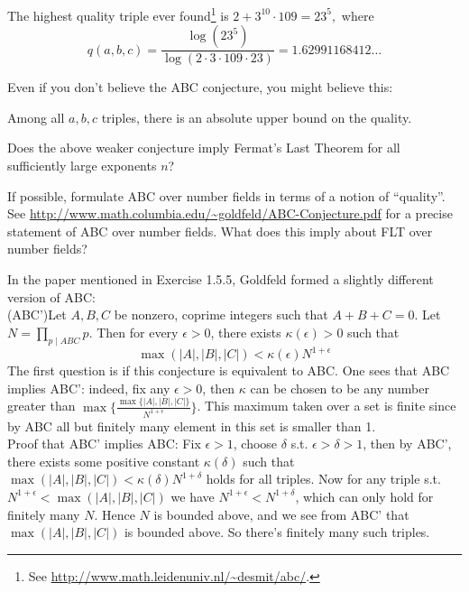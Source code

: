 \documentclass{book}
\begin{document}
The highest quality triple ever found\footnote{See \url{http://www.math.leidenuniv.nl/~desmit/abc/}.} is
$
   2 + 3^{10}\cdot 109 = 23^5,
$
where
$$
q(a,b,c) = \frac{\log(23^5)}{\log(2\cdot 3 \cdot 109 \cdot 23)}
    = 1.62991168412\ldots
$$

Even if you don't believe the ABC conjecture, you might believe this:
\begin{conjecture}
Among all $a,b,c$ triples, there is an absolute upper
bound on the quality.
\end{conjecture}

\begin{exercise}
Does the above weaker conjecture imply Fermat's Last Theorem for all sufficiently large exponents $n$?
\end{exercise}

\begin{exercise}
If possible, formulate ABC over number fields in terms of a notion of ``quality''.  See \url{http://www.math.columbia.edu/~goldfeld/ABC-Conjecture.pdf} for a precise statement of ABC over number fields.
What does this imply about FLT over number fields?
\end{exercise}

In the paper mentioned in Exercise 1.5.5, Goldfeld
formed a slightly different version of ABC: \\

(ABC')Let $A,B,C$ be nonzero, coprime integers such that
$A+B+C = 0$. Let $N = \prod_{p \mid ABC} p$.
Then for every $\epsilon >0$, there exists $\kappa(\epsilon)>0$
such that
\[ \max(|A|,|B|,|C|) < \kappa(\epsilon) N^{1+\epsilon} \]
The first question is if this conjecture is equivalent
to ABC. One sees that ABC implies ABC': indeed, fix
any $\epsilon >0$, then $\kappa$ can be chosen to be any number greater than $\max\{ \frac{\max\{|A|,|B|,|C|\}}{N^{1+\epsilon}}\}$. This maximum taken over a set is finite since by ABC all but finitely many element in
this set is smaller than 1. \\

Proof that ABC' implies ABC: Fix $\epsilon > 1$,
choose $\delta$ s.t. $\epsilon > \delta > 1$, then
by ABC', there exists some positive constant $\kappa(\delta)$
such that $\max(|A|,|B|,|C|) < \kappa(\delta) N^{1+\delta}$
holds for all triples. Now for any triple s.t. $N^{1+\epsilon} < \max(|A|,|B|,|C|)$ we have
$N^{1+\epsilon}< N^{1+\delta}$, which can only hold for
finitely many $N$. Hence $N$ is bounded above, and we see
from ABC' that $\max(|A|,|B|,|C|)$ is bounded above. So
there's finitely many such triples. \\
\end{document}
